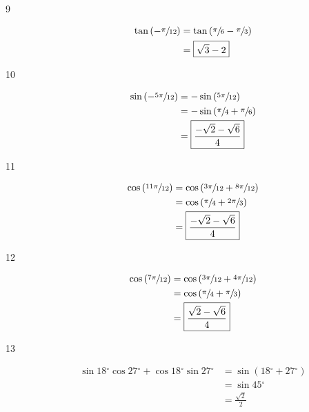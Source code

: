 \documentclass{exam}
\newcommand{\dg}{\ensuremath{^\circ}}
\begin{document}
\begin{description}
      \item[9] 
        \begin{align*}
          \tan \left( - \sfrac{\pi}{12} \right) &= \tan \left( \sfrac{\pi}{6} - \sfrac{\pi}{3} \right) \\
          &= \boxed{ \sqrt{3} - 2 } \\
        \end{align*}

      \item[10] 
        \begin{align*}
          \sin \left( - \sfrac{5 \pi}{12} \right) & = - \sin \left( \sfrac{5 \pi}{12} \right) \\
                                                  & = - \sin \left( \sfrac{\pi}{4} + \sfrac{\pi}{6} \right) \\
                                                  & = \boxed{ \frac{- \sqrt{2} - \sqrt{6}}{4} } \\
        \end{align*}

      \item[11] 
        \begin{align*}
          \cos \left( \sfrac{11 \pi}{12} \right) & = \cos \left( \sfrac{3 \pi}{12} + \sfrac{8 \pi}{12} \right) \\
                                                 & = \cos \left( \sfrac{\pi}{4} + \sfrac{2 \pi}{3} \right) \\
                                                 & = \boxed{ \frac{- \sqrt{2} - \sqrt{6}}{4} } \\
        \end{align*}

      \item[12] 
        \begin{align*}
          \cos \left( \sfrac{7 \pi}{12} \right) & = \cos \left( \sfrac{3 \pi}{12} + \sfrac{4 \pi}{12} \right) \\
                                                & = \cos \left( \sfrac{\pi}{4} + \sfrac{\pi}{3} \right) \\
                                                & = \boxed{ \frac{\sqrt{2} - \sqrt{6}}{4} } \\
        \end{align*}

      \item[13] 
        \begin{align*}
          \sin 18 \dg \cos 27 \dg + \cos 18 \dg \sin 27 \dg & = \sin (18 \dg + 27 \dg) \\
                                                            & = \sin 45 \dg \\
                                                            & = \boxed{ \frac{\sqrt{2}}{2} } \\
        \end{align*}


\end{description}
\end{document}
